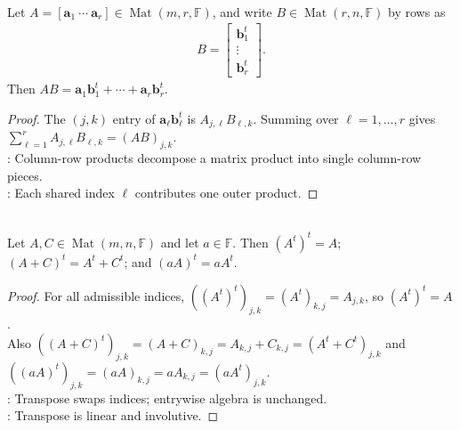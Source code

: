 \begin{proposition} \label{prop:matrix-product-outer-product-decomposition} \\
Let $A=[\mathbf{a}_1\ \cdots\ \mathbf{a}_r]\in\operatorname{Mat}(m,r,\mathbb{F})$, and write $B\in\operatorname{Mat}(r,n,\mathbb{F})$ by rows as
\begin{align}
B=
\begin{bmatrix}
\mathbf{b}_1^t\\
\vdots\\
\mathbf{b}_r^t
\end{bmatrix}.
\nonumber
\end{align}
Then $AB=\mathbf{a}_1\mathbf{b}_1^t+\cdots+\mathbf{a}_r\mathbf{b}_r^t$.
\begin{proof}
The $(j,k)$ entry of $\mathbf{a}_\ell\mathbf{b}_\ell^t$ is $A_{j,\ell}B_{\ell,k}$. Summing over $\ell=1,\ldots,r$ gives $\sum_{\ell=1}^r A_{j,\ell}B_{\ell,k}=(AB)_{j,k}$.\\
: Column-row products decompose a matrix product into single column-row pieces.\\
: Each shared index $\ell$ contributes one outer product.
\end{proof}
\end{proposition}

\begin{proposition} \label{prop:elementary-transpose-rules} \\
Let $A,C\in\operatorname{Mat}(m,n,\mathbb{F})$ and let $a\in\mathbb{F}$. Then $(A^t)^t=A$; $(A+C)^t=A^t+C^t$; and $(aA)^t=aA^t$.
\begin{proof}
For all admissible indices, $((A^t)^t)_{j,k}=(A^t)_{k,j}=A_{j,k}$, so $(A^t)^t=A$.\\
Also $((A+C)^t)_{j,k}=(A+C)_{k,j}=A_{k,j}+C_{k,j}=(A^t+C^t)_{j,k}$ and $((aA)^t)_{j,k}=(aA)_{k,j}=aA_{k,j}=(aA^t)_{j,k}$.\\
: Transpose swaps indices; entrywise algebra is unchanged.\\
: Transpose is linear and involutive.
\end{proof}
\end{proposition}

